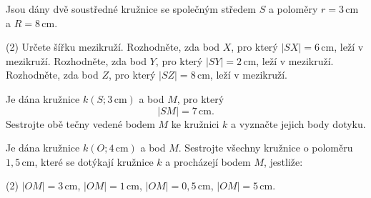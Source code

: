 \documentclass[12pt,a4paper]{article}
\begin{document}

\begin{exercise}

    Jsou dány dvě soustředné kružnice se společným středem $S$ a poloměry
    $r=3\,\mathrm{cm}$ a $R=8\,\mathrm{cm}$.

    \begin{tasks}(2)
        \task Určete šířku mezikruží.
        \task Rozhodněte, zda bod $X$, pro který $|SX|=6\,\mathrm{cm}$, leží v mezikruží.
        \task Rozhodněte, zda bod $Y$, pro který $|SY|=2\,\mathrm{cm}$, leží v mezikruží.
        \task Rozhodněte, zda bod $Z$, pro který $|SZ|=8\,\mathrm{cm}$, leží v mezikruží.
    \end{tasks}

\end{exercise}



\setcounter{section}{6}


\begin{exercise}

    Je dána kružnice $k(S;3\,\mathrm{cm})$ a bod $M$, pro který
    \[
        |SM|=7\,\mathrm{cm}.
    \]
    Sestrojte obě tečny vedené bodem $M$ ke kružnici $k$ a vyznačte jejich body dotyku.

\end{exercise}



\begin{exercise}

    Je dána kružnice $k(O;4\,\mathrm{cm})$ a bod $M$.
    Sestrojte všechny kružnice o poloměru $1{,}5\,\mathrm{cm}$,
    které se dotýkají kružnice $k$ a procházejí bodem $M$, jestliže:

    \begin{tasks}(2)
        \task $|OM|=3\,\mathrm{cm}$,
        \task $|OM|=1\,\mathrm{cm}$,
        \task $|OM|=0{,}5\,\mathrm{cm}$,
        \task $|OM|=5\,\mathrm{cm}$.
    \end{tasks}

\end{exercise}
\end{document}
